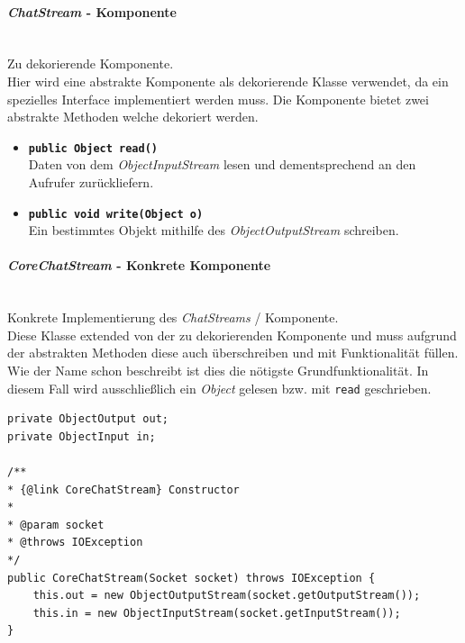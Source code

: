 			\paragraph{\textit{ChatStream} - Komponente}\mbox{}
			\vspace{0.15cm}\\
			Zu dekorierende Komponente.\\
			Hier wird eine abstrakte Komponente als dekorierende Klasse verwendet, da ein spezielles Interface implementiert werden muss. Die Komponente bietet zwei abstrakte Methoden welche dekoriert werden.
			\begin{itemize}
				\item \textbf{\texttt{public Object read()}}\\
				Daten von dem \textit{ObjectInputStream} lesen und dementsprechend an den Aufrufer zurückliefern. 
				
				\item \textbf{\texttt{public void write(Object o)}}\\
				Ein bestimmtes Objekt mithilfe des \textit{ObjectOutputStream} schreiben.
			\end{itemize}
			
			\paragraph{\textit{CoreChatStream} - Konkrete Komponente}\mbox{}
			\vspace{0.15cm}\\
			Konkrete Implementierung des \textit{ChatStreams} / Komponente.\\
			Diese Klasse extended von der zu dekorierenden Komponente und muss aufgrund der abstrakten Methoden diese auch überschreiben und mit Funktionalität füllen.
			Wie der Name schon beschreibt ist dies die nötigste Grundfunktionalität. In diesem Fall wird ausschließlich ein \textit{Object} gelesen bzw. mit \texttt{read} geschrieben.
			
			\begin{lstlisting}[style=JavaG, caption={Konstruktor and in / out Stream CoreChatStream}]
private ObjectOutput out;
private ObjectInput in;

/**
* {@link CoreChatStream} Constructor
*
* @param socket
* @throws IOException
*/
public CoreChatStream(Socket socket) throws IOException {
	this.out = new ObjectOutputStream(socket.getOutputStream());
	this.in = new ObjectInputStream(socket.getInputStream());
}
			\end{lstlisting}
			
